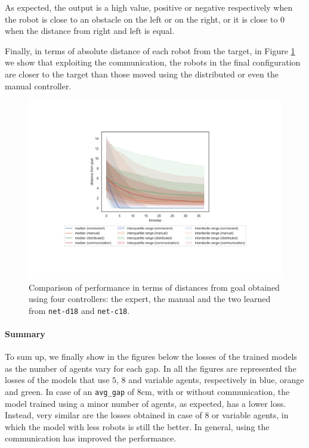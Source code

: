 \noindent
As expected, the output is a high value, positive or 
negative respectively when the robot is close to an obstacle on the left or on 
the 
right, or it is close to $0$ when the distance from right and left is equal.

Finally, in terms of absolute distance of each robot from the target, in Figure 
\ref{fig:net-c18distance} we show that exploiting the communication, the 
robots 
in the final configuration are closer to the target than those moved using the 
distributed or even the manual controller.
\begin{figure}[!htb]
	\centering
	\includegraphics[width=.65\textwidth]{contents/images/net-c18/distances-from-goal-compressed-communication}%
	\caption[Evaluation of \texttt{net-c18} distances from goal.]{Comparison 
	of 
		performance in terms of distances from goal obtained using four controllers: 
		the expert, the manual and the two learned from \texttt{net-d18} and 
		\texttt{net-c18}.}
	\label{fig:net-c18distance}
\end{figure}

\paragraph*{Summary}
To sum up, we finally show in the figures below the losses of the trained 
models as the number of agents vary for each gap. In all the figures are 
represented the losses of the models that use $5$, $8$ and variable agents, 
respectively in blue, orange and green.
In case of an \texttt{avg\_gap} of $8$\gls{cm}, with or without communication, 
the model trained using a minor number of agents, as expected, has a lower loss.
Instead, very similar are the losses obtained in case of $8$ or variable agents, in 
which the model with less robots is still the better.
In general, using the communication has improved the performance.

